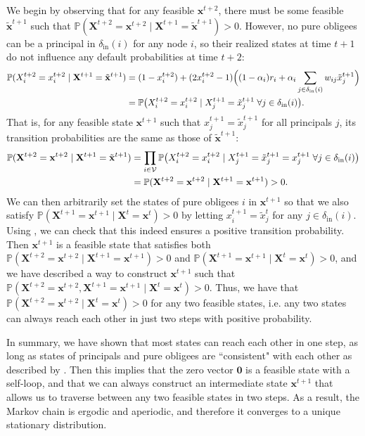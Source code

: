\documentclass[mnsc,nonblindrev]{informs3}
\renewcommand{\Pr}{\mathbb{P}}
\newcommand{\din}{\delta_{\text{in}}}
\newcommand{\Xvec}{\mathbf{X}}
\newcommand{\xvec}{\mathbf{x}}
\let\originalleft\left
\let\originalright\right
\renewcommand{\left}{\mathopen{}\mathclose\bgroup\originalleft}
\renewcommand{\right}{\aftergroup\egroup\originalright}
\renewenvironment{proof}[1][Proof]{%
  \par\noindent{\itshape #1.} \ignorespaces
}{%
  \hfill\Halmos\par
}
\begin{document}
\begin{APPENDICES}
\begin{proof}
    We begin by observing that for any feasible $\xvec^{t+2}$, there must be some feasible $\tilde{\xvec}^{t+1}$ such that
    \(
        \Pr(\Xvec^{t+2}=\xvec^{t+2} \mid \Xvec^{t+1}=\tilde{\xvec}^{t+1}) > 0.
    \)
    However, no pure obligees can be a principal in $\din(i)$ for any node $i$, so their realized states at time $t+1$ do not influence any default probabilities at time $t+2$:
    \begin{align*}
        \Pr(X^{t+2}_i=x^{t+2}_i \mid \Xvec^{t+1}=\tilde{\xvec}^{t+1})
        &= (1-x^{t+2}_i) + (2x^{t+2}_i-1)\Big( (1-\alpha_i)r_i + \alpha_i\sum_{j\in\din(i)}w_{ij}\tilde{x}^{t+1}_j \Big) \\
        &= \Pr\left( X^{t+2}_i=x^{t+2}_i \mid X^{t+1}_j=\tilde{x}^{t+1}_j \;\forall j\in\din(i) \right).
    \end{align*}
    That is, for any feasible state $\xvec^{t+1}$ such that $x^{t+1}_j=\tilde{x}^{t+1}_j$ for all principals $j$, its transition probabilities are the same as those of $\tilde{\xvec}^{t+1}$:
    \begin{align*}
        \Pr(\Xvec^{t+2} = \xvec^{t+2} \mid \Xvec^{t+1}=\tilde{\xvec}^{t+1})
        &= \prod_{i\in\mathcal{V}} \Pr\left( X^{t+2}_i=x^{t+2}_i \mid X^{t+1}_j=\tilde{x}^{t+1}_j=x^{t+1}_j \;\forall j\in\din(i) \right) \\
        &= \Pr(\Xvec^{t+2} = \xvec^{t+2} \mid \Xvec^{t+1}=\xvec^{t+1}) > 0.
    \end{align*}
    We can then arbitrarily set the states of pure obligees $i$ in $\xvec^{t+1}$ so that we also satisfy
    \(
        \Pr(\Xvec^{t+1} = \xvec^{t+1} \mid \Xvec^t = \xvec^t) > 0
    \)
    by letting $x^{t+1}_i=\tilde{x}^t_j$ for any $j\in\din(i)$.  Using , we can check that this indeed ensures a positive transition probability.
    Then $\xvec^{t+1}$ is a feasible state that satisfies both $\Pr(\Xvec^{t+2} = \xvec^{t+2} \mid \Xvec^{t+1} = \xvec^{t+1}) > 0$ and $\Pr(\Xvec^{t+1} = \xvec^{t+1} \mid \Xvec^{t} = \xvec^{t}) > 0$, and we have described a way to construct $\xvec^{t+1}$ such that
    \(
        \Pr(\Xvec^{t+2} = \xvec^{t+2}, \Xvec^{t+1}=\xvec^{t+1} \mid \Xvec^t = \xvec^t) > 0.
    \)
    Thus, we have that
    \(
        \Pr(\Xvec^{t+2} = \xvec^{t+2} \mid \Xvec^t = \xvec^t) > 0
    \)
    for any two feasible states, i.e. any two states can always reach each other in just two steps with positive probability.

    In summary, we have shown that most states can reach each other in one step, as long as states of principals and pure obligees are ``consistent" with each other as described by .
    Then this implies that the zero vector $\mathbf{0}$ is a feasible state with a self-loop, and that we can always construct an intermediate state $\xvec^{t+1}$ that allows us to traverse between any two feasible states in two steps.
    As a result, the Markov chain is ergodic and aperiodic, and therefore it converges to a unique stationary distribution.
    \end{proof}



\end{APPENDICES}
\end{document}
